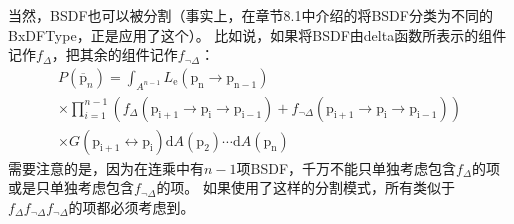 \documentclass[a4paper]{article}
\begin{document}
	当然，BSDF也可以被分割（事实上，在章节8.1中介绍的将BSDF分类为不同的BxDFType，正是应用了这个）。
	比如说，如果将BSDF由delta函数所表示的组件记作$f_{\Delta}$，把其余的组件记作$f_{\neg\Delta}$：
	\begin{multline*}
		P\left(\overline{\mathrm{p}}_{n}\right)=\int_{A^{n-1}} L_{\mathrm{e}}\left(\mathrm{p}_{\mathrm{n}} \rightarrow \mathrm{p}_{\mathrm{n}-1}\right) \\
		\times \prod_{i=1}^{n-1}\left(f_{\Delta}\left(\mathrm{p}_{\mathrm{i}+1} \rightarrow \mathrm{p}_{\mathrm{i}} \rightarrow \mathrm{p}_{\mathrm{i}-1}\right)+f_{\neg \Delta}\left(\mathrm{p}_{\mathrm{i}+1} \rightarrow \mathrm{p}_{\mathrm{i}} \rightarrow \mathrm{p}_{\mathrm{i}-1}\right)\right) \\
		\times G\left(\mathrm{p}_{\mathrm{i}+1} \leftrightarrow \mathrm{p}_{\mathrm{i}}\right) \mathrm{d} A\left(\mathrm{p}_{2}\right) \cdots \mathrm{d} A\left(\mathrm{p}_{\mathrm{n}}\right)
	\end{multline*}
	需要注意的是，因为在连乘中有$n-1$项BSDF，千万不能只单独考虑包含$f_{\Delta}$的项或是只单独考虑包含$f_{\neg\Delta}$的项。
	如果使用了这样的分割模式，所有类似于$f_\Delta f_{\neg\Delta}f_{\neg\Delta}$的项都必须考虑到。
\end{document}
